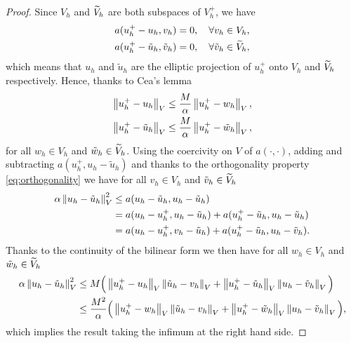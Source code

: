 \documentclass[10pt]{article}
\begin{document}
\begin{proof} Since $V_h$ and $\widetilde V_h$ are both subspaces of $V_h^+$, we have
	\begin{equation}\label{eq:orthogonality}
	\begin{aligned}
		a(u_h^+ - u_h, v_h) &=0, \quad \forall v_h \in V_h,\\
		a(u_h^+ - \tilde u_h, \tilde v_h) &= 0, \quad \forall \tilde v_h \in \widetilde V_h,
	\end{aligned}
	\end{equation}
	which means that $u_h$ and $\tilde u_h$ are the elliptic projection of $u_h^+$ onto $V_h$ and $\widetilde V_h$ respectively. Hence, thanks to Cea's lemma
	\begin{equation}
	\begin{aligned}
		\left\|u_h^+ - u_h\right\|_V \leq \frac{M}{\alpha}\left\|u_h^+ - w_h\right\|_V,\\
		\left\|u_h^+ - \tilde u_h\right\|_V \leq \frac{M}{\alpha}\left\|u_h^+ - \tilde w_h\right\|_V,
	\end{aligned}
	\end{equation}
	for all $w_h \in V_h$ and $\tilde w_h \in \widetilde V_h$.	Using the coercivity on $V$ of $a(\cdot, \cdot)$, adding and subtracting $a(u_h^+, u_h - \tilde u_h)$ and thanks to the orthogonality property \eqref{eq:orthogonality} we have for all $v_h \in V_h$ and $\tilde v_h \in \widetilde V_h$
	\begin{equation}
	\begin{aligned}
		\alpha \left\|u_h - \tilde u_h\right\|_V^2 &\leq a(u_h - \tilde u_h, u_h - \tilde u_h)\\
		&= a(u_h - u_h^+, u_h - \tilde u_h) + a(u_h^+ - \tilde u_h, u_h - \tilde u_h)\\
		&= a(u_h - u_h^+, v_h - \tilde u_h) + a(u_h^+ - \tilde u_h, u_h - \tilde v_h).
	\end{aligned}
	\end{equation}
	Thanks to the continuity of the bilinear form we then have for all $w_h \in V_h$ and $\tilde w_h \in \widetilde V_h$ 
	\begin{equation}
	\begin{aligned}
		\alpha \left\|u_h - \tilde u_h\right\|_V^2 &\leq M \Big(\left\|u_h^+ - u_h\right\|_V\left\|\tilde u_h - v_h\right\|_V + \left\|u_h^+ - \tilde u_h\right\|_V\left\|u_h - \tilde v_h\right\|_V\Big)\\
		&\leq \frac{M^2}{\alpha} \Big(\left\|u_h^+ - w_h\right\|_V\left\|\tilde u_h - v_h\right\|_V + \left\|u_h^+ - \tilde w_h\right\|_V\left\|u_h - \tilde v_h\right\|_V\Big),
	\end{aligned}
	\end{equation}
	which implies the result taking the infimum at the right hand side.
\end{proof}
\end{document}
